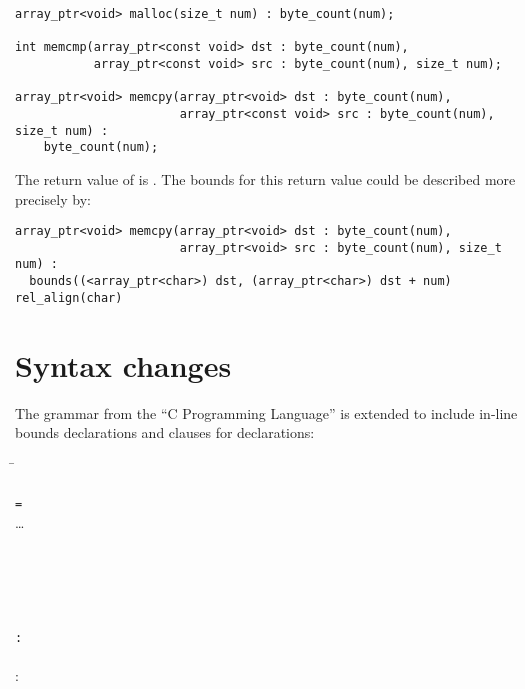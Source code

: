 \begin{lstlisting}
array_ptr<void> malloc(size_t num) : byte_count(num);

int memcmp(array_ptr<const void> dst : byte_count(num),
           array_ptr<const void> src : byte_count(num), size_t num);

array_ptr<void> memcpy(array_ptr<void> dst : byte_count(num),
                       array_ptr<const void> src : byte_count(num), size_t num) :
    byte_count(num);
\end{lstlisting}

The return value of  is . The bounds for
this return value could be described more precisely by:

\begin{lstlisting}
array_ptr<void> memcpy(array_ptr<void> dst : byte_count(num),
                       array_ptr<void> src : byte_count(num), size_t num) :
  bounds((<array_ptr<char>) dst, (array_ptr<char>) dst + num) rel_align(char)
\end{lstlisting}
\section{Syntax changes}
The grammar from the ``C Programming Language'' \cite{Ritchie1988} is extended to include
in-line bounds declarations and  clauses for declarations:

\begin{tabbing}
\= \\
\> \\
\> \lstinline|=|  \\
\>\ldots{} \\
\\
 \\
\>  \\
\\
\\
\>\lstinline|:|  \\
\\
: \\
\>  \\
\\
 \\
\> \\
\>   \\
\\
\=\\
\> \\
\>
\end{tabbing}

